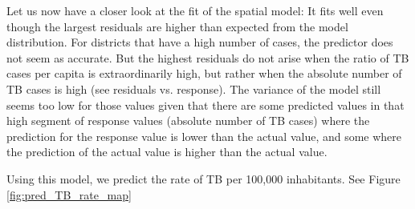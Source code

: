 Let us now have a closer look at the fit of the spatial model: It fits well even though the largest residuals are higher
than expected from the model distribution. For districts that have a high number of cases, the predictor does
not seem as accurate. But the highest residuals do not arise when the ratio of TB cases per capita
is extraordinarily high, but rather when the absolute number of TB cases is high (see residuals vs. response).
The variance of the model still seems too low for those values given that there are some predicted values in
that high segment of response values (absolute number of TB cases) where the prediction for the response
value is lower than the actual value, and some where the prediction of the actual value is higher than the
actual value.
\newline

Using this model, we predict the rate of TB per 100,000 inhabitants. See Figure \ref{fig:pred_TB_rate_map}

